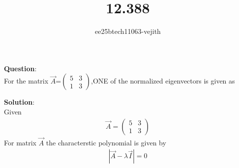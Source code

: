 \documentclass[journal]{IEEEtran}
\begin{document}

\vspace{3cm}

\title{12.388}
\author{ee25btech11063-vejith}

\maketitle
{\let\newpage\relax\maketitle}
\renewcommand{\thefigure}{\theenumi}
\renewcommand{\thetable}{\theenumi}
\setlength{\intextsep}{10pt} %
\textbf{Question}:\\
For the matrix $\Vec{A}$=$\begin{pmatrix}
    5 & 3\\
    1 & 3
\end{pmatrix}$,ONE of the normalized eigenvectors is given as \hspace{7cm} 
\begin{enumerate}
    \begin{multicols}{4}
        \item {}
        \item {}
        \item {}
        \item {}
    \end{multicols}
\end{enumerate}
\textbf{Solution}:\\
Given 
\begin{align}
    \vec{A}=\begin{pmatrix}
    5 & 3\\
    1 & 3
\end{pmatrix}
\end{align}
For matrix $\Vec{A}$ the characterstic polynomial is given by 
\begin{align}
    |\vec{A}-\lambda \vec{I}|=0
\end{align}
\end{document}
